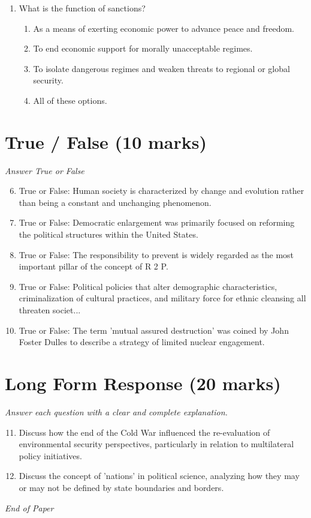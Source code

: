 \documentclass[12pt]{article}
\begin{document}
\begin{enumerate}[label=\arabic*.]
\begin{enumerate}[label=(\alph*)]
    \item The president consulting Congress on foreign policy issues
    \item Bilateral talks that do not involve a third-party negotiator
\end{enumerate}
\item What is the function of sanctions?
\begin{enumerate}[label=(\alph*)]
    \item As a means of exerting economic power to advance peace and freedom.
    \item To end economic support for morally unacceptable regimes.
    \item To isolate dangerous regimes and weaken threats to regional or global security.
    \item All of these options.
\end{enumerate}
\end{enumerate}

\section*{True / False (10 marks)}
\textit{Answer True or False}
\begin{enumerate}[label=\arabic*.]
\setcounter{enumi}{5}
\item True or False: Human society is characterized by change and evolution rather than being a constant and unchanging phenomenon.
\item True or False: Democratic enlargement was primarily focused on reforming the political structures within the United States.
\item True or False: The responsibility to prevent is widely regarded as the most important pillar of the concept of R 2 P.
\item True or False: Political policies that alter demographic characteristics, criminalization of cultural practices, and military force for ethnic cleansing all threaten societ...
\item True or False: The term 'mutual assured destruction' was coined by John Foster Dulles to describe a strategy of limited nuclear engagement.
\end{enumerate}

\section*{Long Form Response (20 marks)}
\textit{Answer each question with a clear and complete explanation.}
\begin{enumerate}[label=\arabic*.]
\setcounter{enumi}{10}
\item Discuss how the end of the Cold War influenced the re-evaluation of environmental security perspectives, particularly in relation to multilateral policy initiatives.
\item Discuss the concept of 'nations' in political science, analyzing how they may or may not be defined by state boundaries and borders.
\end{enumerate}

\vfill
\noindent\textit{End of Paper}
\end{document}
